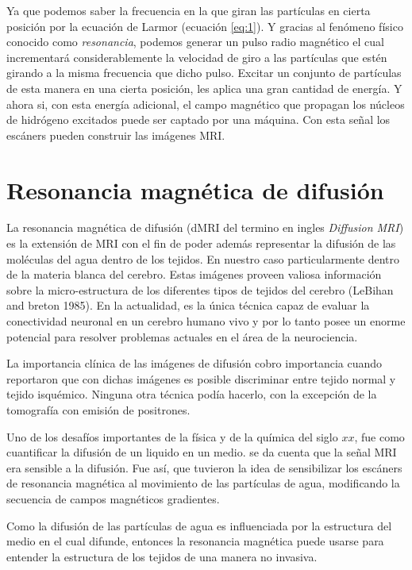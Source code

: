 \documentclass[11pt,a4paper,twoside]{tesis}
\begin{document}
Ya que podemos saber la frecuencia en la que giran las part\'iculas en cierta posici\'on por la
ecuación de Larmor (ecuación \ref{eq:1}). Y gracias al fen\'omeno f\'isico conocido como 
\textit{resonancia}, podemos generar un pulso radio magnético el cual 
incrementar\'a considerablemente la velocidad de giro a las part\'iculas que 
est\'en girando a la misma frecuencia que dicho pulso. Excitar un conjunto 
de part\'iculas de esta manera en una cierta posici\'on, les aplica una 
gran cantidad de energ\'ia. Y ahora si, con esta energía adicional, el campo 
magn\'etico que propagan los n\'ucleos de hidr\'ogeno excitados puede ser 
captado por una m\'aquina. Con esta se\~nal los escáners pueden construir las 
im\'agenes MRI.


\section{Resonancia magnética de difusi\'on}


La resonancia magnética de difusi\'on (dMRI del termino en ingles 
\textit{Diffusion MRI}) es la extensi\'on de MRI con el fin de poder adem\'as  
representar la 
difusi\'on de las mol\'eculas del agua dentro de los tejidos. En nuestro caso particularmente 
dentro de la materia blanca del cerebro. Estas im\'agenes proveen valiosa información sobre la 
micro-estructura de los diferentes tipos de tejidos del cerebro (LeBihan and breton 1985). En la 
actualidad, es la única técnica capaz de evaluar 
la conectividad neuronal en un cerebro humano vivo y por lo tanto posee un enorme potencial para 
resolver problemas actuales en el área de la neurociencia.

La importancia cl\'inica de las im\'agenes de difusi\'on cobro 
importancia cuando \citet{Moseley1990} reportaron que con dichas im\'agenes es 
posible discriminar entre tejido normal y tejido isqu\'emico. Ninguna 
otra t\'ecnica pod\'ia hacerlo, con la excepci\'on de la tomograf\'ia con 
emisi\'on de positrones. 

Uno de los desafíos importantes de la física y de la química del siglo $xx$, 
fue como cuantificar la difusión de un liquido en un medio. \citet{Hahn1950} se da 
cuenta que la señal MRI era sensible a la difusión. Fue as\'i, que \citet{CarrH.Y.andPurcell1954} 
tuvieron la idea de sensibilizar los escáners de resonancia magnética al movimiento de las 
part\'iculas de agua, 
modificando la secuencia de campos magn\'eticos gradientes.

Como la difusi\'on de las part\'iculas de agua es influenciada por la estructura del medio en el 
cual difunde, entonces la resonancia magnética puede usarse para entender la 
estructura de los tejidos de una manera no invasiva.  
\end{document}
